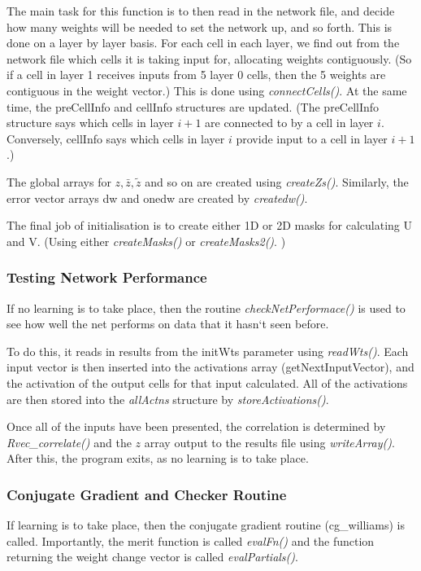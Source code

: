 \documentclass[a4paper]{article}
\newcommand{\zbar}{\bar{z}}
\newcommand{\ztilde}{\tilde{z}}
\begin{document}
The main task for this function is to then read in the network file,
and decide how many weights will be needed to set the network up, and
so forth.  This is done on a layer by layer basis.  For each cell in
each layer, we find out from the network file which cells it is taking
input for, allocating weights contiguously. (So if a cell in layer 1
receives inputs from 5 layer 0 cells, then the 5 weights are
contiguous in the weight vector.)  This is done using {\em connectCells()}.
At the same time, the preCellInfo and cellInfo structures are
updated. (The preCellInfo structure says which cells in layer $i+1$
are connected to by a cell in layer $i$. Conversely, cellInfo says
which cells in layer $i$ provide input to a cell in layer $i+1$.)

The global arrays for $z, \zbar, \ztilde$ and so on are created using
{\em createZs()}.  Similarly, the error vector arrays dw and onedw are
created by {\em createdw()}.  

The final job of initialisation is to create either 1D or 2D masks for
calculating U and V.  (Using either {\em createMasks()}  or {\em createMasks2()}. )

\subsubsection{Testing Network Performance}

If no learning is to take place, then the routine {\em checkNetPerformace()}
is used to see how well the net performs on data that it hasn`t seen
before.

To do this, it reads in results from the initWts parameter using
{\em readWts()}.  Each input vector is then inserted into the activations
array (getNextInputVector), and the activation of the output cells for
that input calculated.  All of the activations are then stored into
the {\em allActns} structure by {\em storeActivations()}.

Once all of the inputs have been presented, the correlation is
determined by {\em Rvec\_correlate()} and the $z$ array output to the results
file using {\em writeArray()}. After this, the program exits, as no learning
is to take place.

\subsubsection{Conjugate Gradient and Checker Routine}

If learning is to take place, then the conjugate gradient routine
(cg\_williams) is called.  Importantly, the merit function is called
{\em evalFn()} and the function returning the weight change vector is called
{\em evalPartials()}.  
\end{document}
